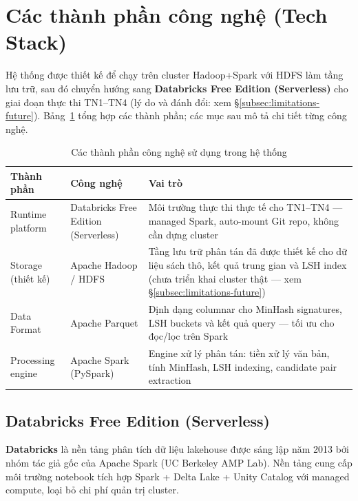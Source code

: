 \newpage
\section{Các thành phần công nghệ (Tech Stack)}
\label{sec:techstack}

Hệ thống được thiết kế để chạy trên cluster Hadoop+Spark với HDFS làm tầng lưu trữ, sau đó chuyển hướng sang \textbf{Databricks Free Edition (Serverless)} cho giai đoạn thực thi TN1--TN4 (lý do và đánh đổi: xem \S\ref{subsec:limitations-future}). Bảng~\ref{tab:techstack} tổng hợp các thành phần; các mục sau mô tả chi tiết từng công nghệ.

\begin{table}[H]
\centering
\caption{Các thành phần công nghệ sử dụng trong hệ thống}
\label{tab:techstack}
\begin{tabularx}{\textwidth}{|l|l|X|}
\hline
\textbf{Thành phần} & \textbf{Công nghệ} & \textbf{Vai trò} \\
\hline
Runtime platform & Databricks Free Edition (Serverless) & Môi trường thực thi thực tế cho TN1--TN4 --- managed Spark, auto-mount Git repo, không cần dựng cluster \\
\hline
Storage (thiết kế) & Apache Hadoop / HDFS & Tầng lưu trữ phân tán đã được thiết kế cho dữ liệu sách thô, kết quả trung gian và LSH index (chưa triển khai cluster thật --- xem \S\ref{subsec:limitations-future}) \\
\hline
Data Format & Apache Parquet & Định dạng columnar cho MinHash signatures, LSH buckets và kết quả query --- tối ưu cho đọc/lọc trên Spark \\
\hline
Processing engine & Apache Spark (PySpark) & Engine xử lý phân tán: tiền xử lý văn bản, tính MinHash, LSH indexing, candidate pair extraction \\
\hline
\end{tabularx}
\end{table}

\subsection{Databricks Free Edition (Serverless)}

\textbf{Databricks} là nền tảng phân tích dữ liệu lakehouse được sáng lập năm 2013 bởi nhóm tác giả gốc của Apache Spark (UC Berkeley AMP Lab). Nền tảng cung cấp môi trường notebook tích hợp Spark + Delta Lake + Unity Catalog với managed compute, loại bỏ chi phí quản trị cluster.

